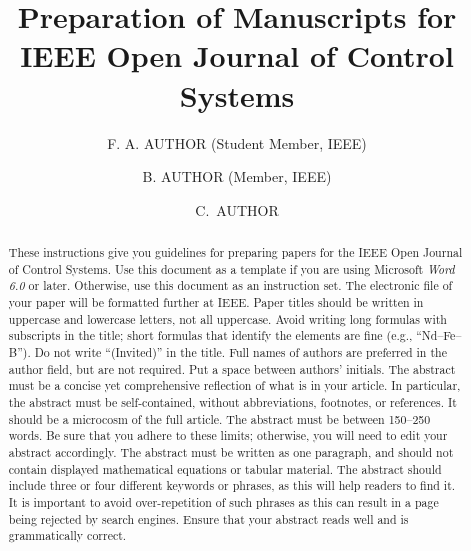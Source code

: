 \documentclass{IEEEojcsys}
\begin{document}

\title{Preparation of Manuscripts for IEEE Open Journal of Control Systems} 


\author{F. A. AUTHOR (Student Member, IEEE)}

\author{B. AUTHOR  (Member, IEEE)}

\author{C.~AUTHOR}





\begin{abstract}
These instructions give you guidelines for preparing papers for the IEEE Open Journal of Control Systems. Use this document as a template if you are using Microsoft {\it Word 6.0} or later. Otherwise, use this document as an instruction set. The electronic file of your paper will be formatted further at IEEE. Paper titles should be written in uppercase and lowercase letters, not all uppercase. Avoid writing long formulas with subscripts in the title; short formulas that identify the elements are fine (e.g., ``Nd--Fe--B''). Do not write ``(Invited)'' in the title. Full names of authors are preferred in the author field, but are not required. Put a space between authors' initials. The abstract must be a concise yet comprehensive reflection of what is in your article. In particular, the abstract must be self-contained, without abbreviations, footnotes, or references. It should be a microcosm of the full article. The abstract must be between 150--250 words. Be sure that you adhere to these limits; otherwise, you will need to edit your abstract accordingly. The abstract must be written as one paragraph, and should not contain displayed mathematical equations or tabular material. The abstract should include three or four different keywords or phrases, as this will help readers to find it. It is important to avoid over-repetition of such phrases as this can result in a page being rejected by search engines. Ensure that your abstract reads well and is grammatically correct.
\end{abstract}
\end{document}

